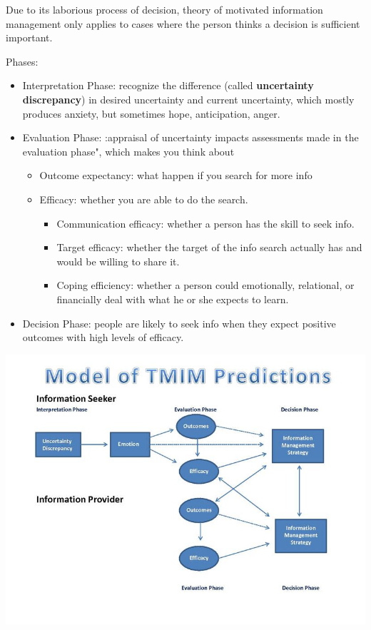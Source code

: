 \documentclass[
]{book}
\providecommand{\tightlist}{%
  \setlength{\itemsep}{0pt}\setlength{\parskip}{0pt}}
\begin{document}
Due to its laborious process of decision, theory of motivated information management only applies to cases where the person thinks a decision is sufficient important.

Phases:

\begin{itemize}
\item
  Interpretation Phase: recognize the difference (called \textbf{uncertainty discrepancy}) in desired uncertainty and current uncertainty, which mostly produces anxiety, but sometimes hope, anticipation, anger.\\
\item
  Evaluation Phase: :appraisal of uncertainty impacts assessments made in the evaluation phase", which makes you think about

  \begin{itemize}
  \item
    Outcome expectancy: what happen if you search for more info\\
  \item
    Efficacy: whether you are able to do the search.

    \begin{itemize}
    \tightlist
    \item
      Communication efficacy: whether a person has the skill to seek info.\\
    \item
      Target efficacy: whether the target of the info search actually has and would be willing to share it.\\
    \item
      Coping efficiency: whether a person could emotionally, relational, or financially deal with what he or she expects to learn.
    \end{itemize}
  \end{itemize}
\item
  Decision Phase: people are likely to seek info when they expect positive outcomes with high levels of efficacy.
\end{itemize}

\begin{center}\includegraphics[width=11.11in]{images/Model of TMIM Predicitons} \end{center}
\end{document}

